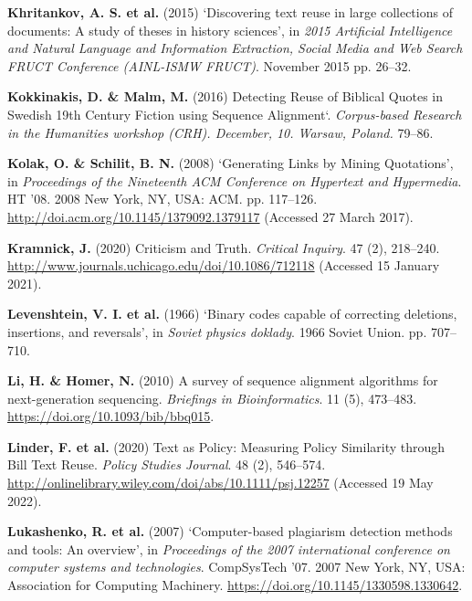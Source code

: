 \documentclass[
]{article}
\newlength{\cslhangindent}
\newlength{\cslentryspacingunit} %
\newenvironment{CSLReferences}[2] %
 {%
  \setlength{\parindent}{0pt}
  \ifodd #1
  \let\oldpar\par
  \def\par{\hangindent=\cslhangindent\oldpar}
  \fi
  \setlength{\parskip}{#2\cslentryspacingunit}
 }%
 {}
\begin{document}
\begin{CSLReferences}{1}{0}
\leavevmode{}%
\textbf{Khritankov, A. S. et al.} (2015) {`Discovering text reuse in
large collections of documents: {A} study of theses in history
sciences'}, in \emph{2015 {Artificial Intelligence} and {Natural
Language} and {Information Extraction}, {Social Media} and {Web Search
FRUCT Conference} ({AINL-ISMW FRUCT})}. November 2015 pp. 26--32.

\leavevmode{}%
\textbf{Kokkinakis, D. \& Malm, M.} (2016) Detecting {Reuse} of
{Biblical Quotes} in {Swedish} 19th {Century Fiction} using {Sequence
Alignment}`. \emph{Corpus-based Research in the Humanities workshop
(CRH). December, 10. Warsaw, Poland.} 79--86.

\leavevmode{}%
\textbf{Kolak, O. \& Schilit, B. N.} (2008) {`Generating {Links} by
{Mining Quotations}'}, in \emph{Proceedings of the {Nineteenth ACM
Conference} on {Hypertext} and {Hypermedia}}. {HT} '08. 2008 {New York,
NY, USA}: {ACM}. pp. 117--126.
\url{http://doi.acm.org/10.1145/1379092.1379117} (Accessed 27 March
2017).

\leavevmode{}%
\textbf{Kramnick, J.} (2020) Criticism and {Truth}. \emph{Critical
Inquiry}. 47 (2), 218--240.
\url{http://www.journals.uchicago.edu/doi/10.1086/712118} (Accessed 15
January 2021).

\leavevmode{}%
\textbf{Levenshtein, V. I. et al.} (1966) {`Binary codes capable of
correcting deletions, insertions, and reversals'}, in \emph{Soviet
physics doklady}. 1966 Soviet Union. pp. 707--710.

\leavevmode{}%
\textbf{Li, H. \& Homer, N.} (2010) {A survey of sequence alignment
algorithms for next-generation sequencing}. \emph{Briefings in
Bioinformatics}. 11 (5), 473--483.
\url{https://doi.org/10.1093/bib/bbq015}.

\leavevmode{}%
\textbf{Linder, F. et al.} (2020) Text as {Policy}: {Measuring Policy
Similarity} through {Bill Text Reuse}. \emph{Policy Studies Journal}. 48
(2), 546--574.
\url{http://onlinelibrary.wiley.com/doi/abs/10.1111/psj.12257} (Accessed
19 May 2022).

\leavevmode{}%
\textbf{Lukashenko, R. et al.} (2007) {`Computer-based plagiarism
detection methods and tools: An overview'}, in \emph{Proceedings of the
2007 international conference on computer systems and technologies}.
CompSysTech '07. 2007 New York, NY, USA: Association for Computing
Machinery. \url{https://doi.org/10.1145/1330598.1330642}.


\end{CSLReferences}
\end{document}
